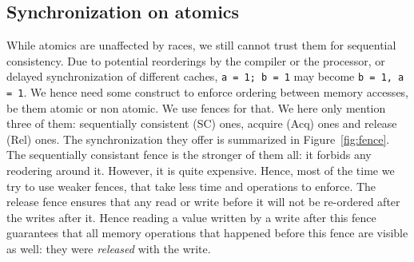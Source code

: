 \subsection{Synchronization on atomics}
While atomics are unaffected by races, we still cannot trust them for sequential consistency. Due to potential reorderings by the compiler or the processor, or delayed synchronization of different caches, \texttt{a = 1; b = 1} may become \texttt{b = 1, a = 1}. We hence need some construct to enforce ordering between memory accesses, be them atomic or non atomic. We use fences for that. We here only mention three of them: sequentially consistent (SC) ones, acquire (Acq) ones and release (Rel) ones. The synchronization they offer is summarized in Figure~\ref{fig:fence}. The sequentially consistant fence is the stronger of them all: it forbids any reodering around it. However, it is quite expensive. Hence, most of the time we try to use weaker fences, that take less time and operations to enforce. The release fence ensures that any read or write before it will not be re-ordered after the writes after it. Hence reading a value written by a write after this fence guarantees that all memory operations that happened before this fence are visible as well: they were \emph{released} with the write.

